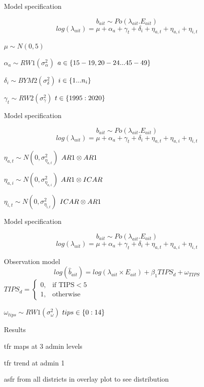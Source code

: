 \documentclass[ignorenonframetext,]{beamer}
\begin{document}
\begin{frame}[t]{Model specification}
\protect\hypertarget{model-specification}{}

\[b_{ait} \sim Po( \lambda_{ait} . E_{ait} )\]
\[log(\lambda_{ait}) = \mu + \alpha_a + \gamma_t + \delta_i + \eta_{a,t} + \eta_{a,i} + \eta_{i,t}\]

\(\mu \sim N(0, 5)\)

\(\alpha_a \sim RW1(\sigma^2_\alpha)\)
\(\hfill a \in \{15-19, 20-24 ... 45-49\}\)

\(\delta_i \sim BYM2(\sigma^2_\delta)\) \(\hfill i \in \{1 ... n_i\}\)

\(\gamma_t \sim RW2(\sigma^2_\gamma)\) \(\hfill t \in \{1995:2020\}\)

\end{frame}

\begin{frame}[t]{Model specification}
\protect\hypertarget{model-specification-1}{}

\[b_{ait} \sim Po( \lambda_{ait} . E_{ait} )\]
\[log(\lambda_{ait}) = \mu + \alpha_a + \gamma_t + \delta_i + \eta_{a,t} + \eta_{a,i} + \eta_{i,t}\]

\(\eta_{a,t} \sim N(0, \sigma^2_{\eta_{a,t}})\)
\(\hfill AR1 \otimes AR1\)

\(\eta_{a,i} \sim N(0, \sigma^2_{\eta_{a,i}})\)
\(\hfill AR1 \otimes ICAR\)

\(\eta_{i,t} \sim N(0, \sigma^2_{\eta_{i,t}})\)
\(\hfill ICAR \otimes AR1\)

\end{frame}

\begin{frame}[t]{Model specification}
\protect\hypertarget{model-specification-2}{}

\[b_{ait} \sim Po( \lambda_{ait} . E_{ait} )\]
\[log(\lambda_{ait}) = \mu + \alpha_a + \gamma_t + \delta_i + \eta_{a,t} + \eta_{a,i} + \eta_{i,t}\]

Observation model
\[log(\hat{b}_{ait}) = log(\lambda_{ait} \times E_{ait}) + \beta_1 TIPS_{d} + \omega_{TIPS}\]
\(TIPS_d=\begin{cases} 0, & \text{if TIPS} < 5 \\ 1, & \text{otherwise} \end{cases}\)

\(\omega_{tips} \sim RW1(\sigma^2_\omega)\) \(\hfill tips \in \{0:14\}\)

\end{frame}

\begin{frame}{Results}
\protect\hypertarget{results}{}

tfr maps at 3 admin levels

tfr trend at admin 1

asfr from all districts in overlay plot to see distribution

\end{frame}
\end{document}
